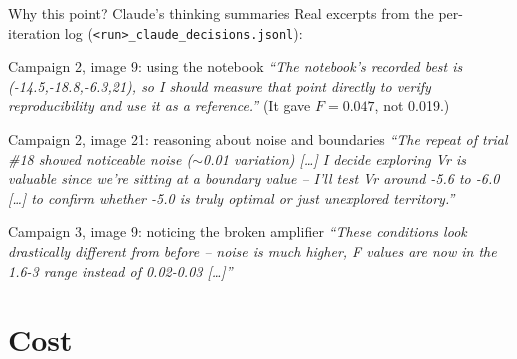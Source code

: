 \documentclass[aspectratio=169,10pt]{beamer}
\begin{document}
\begin{frame}{Why this point? Claude's thinking summaries}
  \small
  Real excerpts from the per-iteration log (\texttt{<run>\_claude\_decisions.jsonl}):

  \vspace{2mm}
  \begin{block}{Campaign 2, image 9: using the notebook}
    \scriptsize\emph{``The notebook's recorded best is (-14.5,-18.8,-6.3,21), so I should
    measure that point directly to verify reproducibility and use it as a reference.''}
    \quad (It gave $F = 0.047$, not 0.019.)
  \end{block}
  \vspace{1mm}
  \begin{block}{Campaign 2, image 21: reasoning about noise and boundaries}
    \scriptsize\emph{``The repeat of trial \#18 showed noticeable noise ($\sim$0.01 variation)
    [\dots] I decide exploring Vr is valuable since we're sitting at a boundary value --
    I'll test Vr around -5.6 to -6.0 [\dots] to confirm whether -5.0 is truly optimal or
    just unexplored territory.''}
  \end{block}
  \vspace{1mm}
  \begin{block}{Campaign 3, image 9: noticing the broken amplifier}
    \scriptsize\emph{``These conditions look drastically different from before -- noise is
    much higher, F values are now in the 1.6-3 range instead of 0.02-0.03 [\dots]''}
  \end{block}
\end{frame}

\section{Cost}
\end{document}
